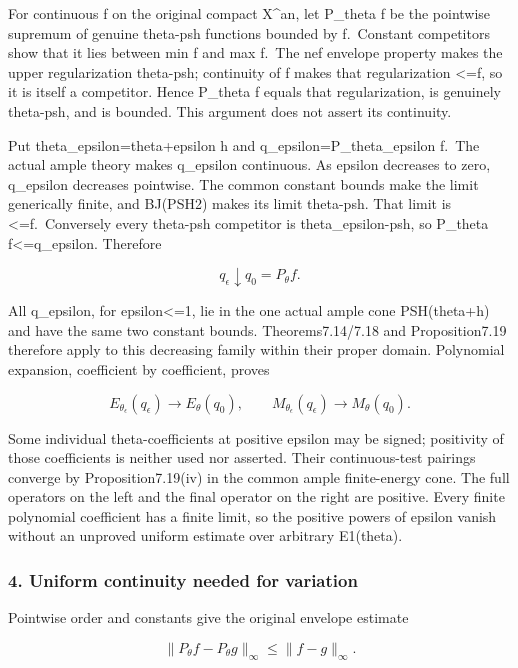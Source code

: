 \documentclass[
  10pt,
]{article}
\begin{document}
For continuous f on the original compact X\^{}an, let P\_theta f be the
pointwise supremum of genuine theta-psh functions bounded by f.~Constant
competitors show that it lies between min f and max f.~The nef envelope
property makes the upper regularization theta-psh; continuity of f makes
that regularization \textless=f, so it is itself a competitor. Hence
P\_theta f equals that regularization, is genuinely theta-psh, and is
bounded. This argument does not assert its continuity.

Put theta\_epsilon=theta+epsilon h and q\_epsilon=P\_theta\_epsilon
f.~The actual ample theory makes q\_epsilon continuous. As epsilon
decreases to zero, q\_epsilon decreases pointwise. The common constant
bounds make the limit generically finite, and BJ(PSH2) makes its limit
theta-psh. That limit is \textless=f.~Conversely every theta-psh
competitor is theta\_epsilon-psh, so P\_theta f\textless=q\_epsilon.
Therefore

\[q_\epsilon\downarrow q_0=P_\theta f.\]

All q\_epsilon, for epsilon\textless=1, lie in the one actual ample cone
PSH(theta+h) and have the same two constant bounds. Theorems7.14/7.18
and Proposition7.19 therefore apply to this decreasing family within
their proper domain. Polynomial expansion, coefficient by coefficient,
proves

\[E_{\theta_\epsilon}(q_\epsilon)\longrightarrow E_\theta(q_0),\qquad
M_{\theta_\epsilon}(q_\epsilon)\longrightarrow M_\theta(q_0).\]

Some individual theta-coefficients at positive epsilon may be signed;
positivity of those coefficients is neither used nor asserted. Their
continuous-test pairings converge by Proposition7.19(iv) in the common
ample finite-energy cone. The full operators on the left and the final
operator on the right are positive. Every finite polynomial coefficient
has a finite limit, so the positive powers of epsilon vanish without an
unproved uniform estimate over arbitrary E1(theta).

\subsubsection{4. Uniform continuity needed for
variation}\label{uniform-continuity-needed-for-variation}

Pointwise order and constants give the original envelope estimate

\[\|P_\theta f-P_\theta g\|_\infty\leq\|f-g\|_\infty.\]
\end{document}
